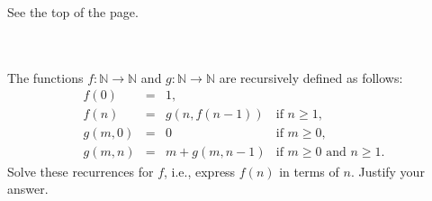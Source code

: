 \documentclass[12pt]{article}
\newcommand{\IN}{\mathbb{N}}
\begin{document}

\begin{question}
See the top of the page.
\end{question}

\begin{question} \\ \\
The functions $f : \IN \rightarrow \IN$ and $g : \IN \rightarrow \IN$ 
are recursively defined as follows:
\[ \begin{array}{lcll} 
      f(0) & = & 1 , & \\ 
      f(n) & = & g(n,f(n-1)) & \mbox{if $n \geq 1$,}  \\ 
      g(m,0) & = & 0 & \mbox{if $m \geq 0$,} \\ 
      g(m,n) & = & m + g(m,n-1) & \mbox{if $m \geq 0$ and $n \geq 1$.}
   \end{array} 
\] 
Solve these recurrences for $f$, i.e., express $f(n)$ in terms of $n$.  
Justify your answer. 
\end{question}
\end{document}

